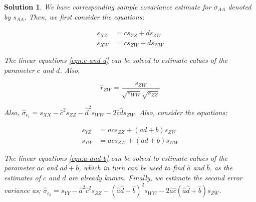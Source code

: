 \documentclass[12pt]{article}
\theoremstyle{problemstyle}
\newtheorem*{solution*}{Solution}
\begin{document}
\begin{solution*}
We have corresponding sample covariance estimate for $\sigma_{AA}$ denoted by $s_{AA}$. Then, we first consider the equations;

\begin{align}
	\label{eqn:c-and-d}
	s_{XZ} & = c s_{ZZ} + d s_{ZW}\\
	s_{XW} & = c s_{ZW} + d s_{WW}
\end{align}

The linear equations \ref{eqn:c-and-d} can be solved to estimate values of the parameter $c$ and $d$. Also, 

$$\hat{r}_{ZW} = \dfrac{s_{ZW}}{\sqrt{s_{WW}}\sqrt{s_{ZZ}}}$$

Also, $\hat{\sigma}_{\epsilon_1} = s_{XX} - \hat{c}^2 s_{ZZ} - \hat{d}^2 s_{WW} - 2\hat{c}\hat{d} s_{ZW}$. Also, consider the equations;

\begin{align}
\label{eqn:a-and-b}
s_{YZ} & = ac s_{ZZ} + (ad+b) s_{ZW}\\
s_{YW} & = ac s_{ZW} + (ad+b) s_{WW}
\end{align}

The linear equations \ref{eqn:a-and-b} can be solved to estimate values of the parameter $ac$ and $ad+b$, which in turn can be used to find $\hat{a}$ and $\hat{b}$, as the estimates of $c$ and $d$ are already known. Finally, we estimate the second error variance as; $\hat{\sigma}_{\epsilon_2} = s_{YY} - \hat{a}^2\hat{c}^2 s_{ZZ} - (\hat{a}\hat{d} + \hat{b})^2 s_{WW} - 2\hat{a}\hat{c}(\hat{a}\hat{d} + \hat{b}) s_{ZW}$.














\end{solution*}
\end{document}
